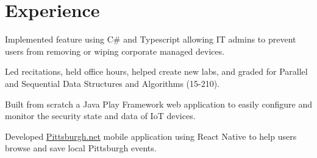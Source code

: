 \documentclass[]{openfont}
\begin{document}
\begin{minipage}[t]{0.60\textwidth} 


\section{Experience}

\vspace{\topsep} %
\begin{tightemize}
    \item Implemented feature using C\# and Typescript allowing IT admins to
        prevent users from removing or wiping corporate managed devices.
\end{tightemize}

\vspace{\topsep} %
\begin{tightemize}
    \item Led recitations, held office hours, helped create new labs, and graded
        for Parallel and Sequential Data Structures and Algorithms (15-210).
\end{tightemize}

\vspace{\topsep} %
\begin{tightemize}
    \item Built from scratch a Java Play Framework web application to easily configure and monitor the security state and data of IoT devices.
\end{tightemize}

\vspace{\topsep} %
\begin{tightemize}
    \item Developed \href{http://www.pittsburgh.net/}{Pittsburgh.net} mobile
        application using React Native to help users browse and save local
        Pittsburgh events.
\end{tightemize}


\end{minipage}
\end{document}
